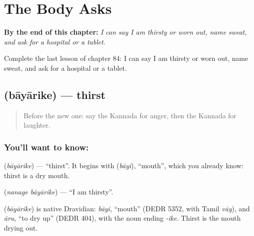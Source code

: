
\chapter{The Body Asks}
\label{ch:ka-the-body-asks}

\begin{chapteropening}
\textbf{By the end of this chapter:} \emph{I can say I am thirsty or worn out, name sweat, and ask for a hospital or a tablet.}

Complete the last lesson of chapter 84: I can say I am thirsty or worn out, name sweat, and ask for a hospital or a tablet.
\end{chapteropening}

\section[\texorpdfstring{\kn{ಬಾಯಾರಿಕೆ} (bāyārike)}{ಬಾಯಾರಿಕೆ (bāyārike)}]{ (bāyārike) — thirst}

\label{lesson:KA-C84-thirst}



\begin{quote}
Before the new one: say the Kannada for anger, then the Kannada for laughter.
\end{quote}

\subsection*{You'll want to know: }
\textbf{} (\emph{bāyārike}) — \textquotedblleft{}thirst\textquotedblright{}. It begins with \textbf{} (\emph{bāyi}), \textquotedblleft{}mouth\textquotedblright{}, which you already know: thirst is a dry mouth.

\textbf{ } (\emph{nanage bāyārike}) — \textquotedblleft{}I am thirsty\textquotedblright{}.

\begin{cousinweb}
\textbf{} (\emph{bāyārike}) is native Dravidian: \emph{bāyi}, \textquotedblleft{}mouth\textquotedblright{} (DEDR 5352, with Tamil \emph{vāy}), and \emph{āru}, \textquotedblleft{}to dry up\textquotedblright{} (DEDR 404), with the noun ending \emph{-ike}. Thirst is the mouth drying out.
\end{cousinweb}

